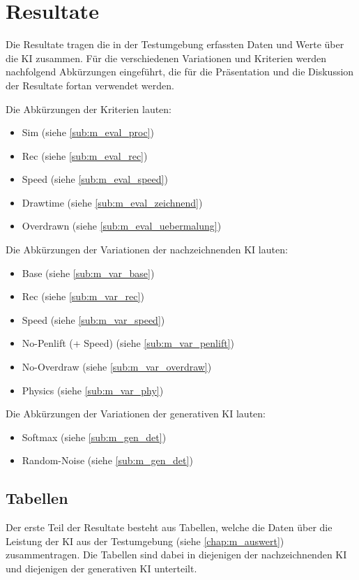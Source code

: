\chapter{Resultate}\label{chap:r} 

Die Resultate tragen die in der Testumgebung erfassten Daten und Werte über die
KI zusammen. Für die verschiedenen Variationen und Kriterien werden nachfolgend
Abkürzungen eingeführt, die für die Präsentation und die Diskussion der
Resultate fortan verwendet werden.

Die Abkürzungen der Kriterien lauten:
\begin{itemize}
    \item Sim (siehe \ref{sub:m_eval_proc})
    \item Rec (siehe \ref{sub:m_eval_rec})
    \item Speed (siehe \ref{sub:m_eval_speed})
    \item Drawtime  (siehe \ref{sub:m_eval_zeichnend})
    \item Overdrawn (siehe \ref{sub:m_eval_uebermalung})
\end{itemize}

Die Abkürzungen der Variationen der nachzeichnenden KI lauten: 
\begin{itemize}
    \item Base (siehe \ref{sub:m_var_base})
    \item Rec (siehe \ref{sub:m_var_rec})
    \item Speed (siehe \ref{sub:m_var_speed})
    \item No-Penlift (+ Speed) (siehe \ref{sub:m_var_penlift})
    \item No-Overdraw (siehe \ref{sub:m_var_overdraw})
    \item Physics (siehe \ref{sub:m_var_phy})
\end{itemize}

Die Abkürzungen der Variationen der generativen KI lauten:
\begin{itemize}
    \item Softmax (siehe \ref{sub:m_gen_det})
    \item Random-Noise (siehe \ref{sub:m_gen_det})
\end{itemize}



\section{Tabellen}\label{chap:r_tab} 

Der erste Teil der Resultate besteht aus Tabellen, welche die Daten über die
Leistung der KI aus der Testumgebung (siehe \ref{chap:m_auswert})
zusammentragen. Die Tabellen sind dabei in diejenigen der nachzeichnenden KI und
diejenigen der generativen KI unterteilt.

